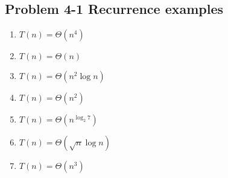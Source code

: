\subsection*{Problem 4-1 Recurrence examples}
\begin{enumerate}
	\item	$T(n)=\Theta(n^4)$
	\item	$T(n)=\Theta(n)$
	\item	$T(n)=\Theta(n^2 \log n)$
	\item	$T(n)=\Theta(n^2)$
	\item	$T(n)=\Theta(n^{\log_2{7}})$
	\item	$T(n)=\Theta(\sqrt{n} \log n)$
	\item	$T(n)=\Theta(n^3)$
\end{enumerate}

